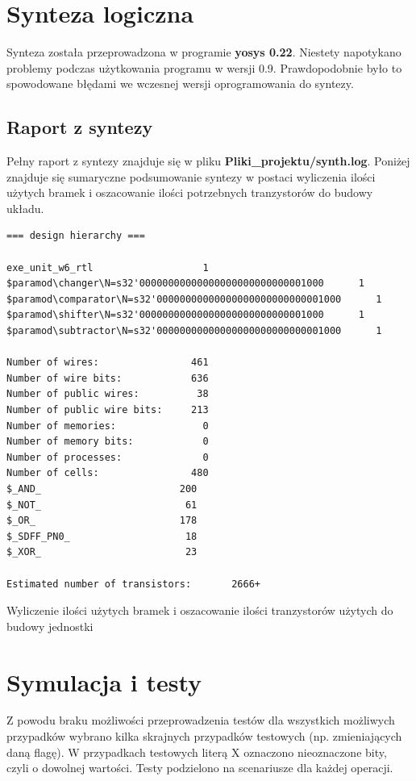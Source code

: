 \documentclass[12pt]{article}
\begin{document}
	\section*{Synteza logiczna}
	Synteza została przeprowadzona w programie \textbf{yosys 0.22}. Niestety napotykano problemy podczas użytkowania programu w wersji 0.9. Prawdopodobnie było to spowodowane błędami we wczesnej wersji oprogramowania do syntezy.
	\subsection*{Raport z syntezy}
	Pełny raport z syntezy znajduje się w pliku \textbf{Pliki\_projektu/synth.log}. Poniżej znajduje się sumaryczne podsumowanie syntezy w postaci wyliczenia ilości użytych bramek i oszacowanie ilości potrzebnych tranzystorów do budowy układu. 
	
	\begin{program}
		\begin{verbatim}
=== design hierarchy ===

exe_unit_w6_rtl                   1
$paramod\changer\N=s32'00000000000000000000000000001000      1
$paramod\comparator\N=s32'00000000000000000000000000001000      1
$paramod\shifter\N=s32'00000000000000000000000000001000      1
$paramod\subtractor\N=s32'00000000000000000000000000001000      1

Number of wires:                461
Number of wire bits:            636
Number of public wires:          38
Number of public wire bits:     213
Number of memories:               0
Number of memory bits:            0
Number of processes:              0
Number of cells:                480
$_AND_                        200
$_NOT_                         61
$_OR_                         178
$_SDFF_PN0_                    18
$_XOR_                         23

Estimated number of transistors:       2666+
		\end{verbatim}
		\caption*{Wyliczenie ilości użytych bramek i oszacowanie ilości tranzystorów użytych do budowy jednostki}
		\label{code:output}
	\end{program}
\vspace{-20pt}
	
	\section*{Symulacja i testy}
	
	Z powodu braku możliwości przeprowadzenia testów dla wszystkich możliwych przypadków wybrano kilka skrajnych przypadków testowych (np. zmieniających daną flagę). W przypadkach testowych literą X oznaczono nieoznaczone bity, czyli o dowolnej wartości.  Testy podzielono na scenariusze dla każdej operacji. 
	
\end{document}
